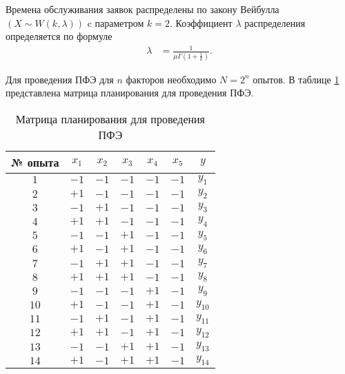 \documentclass[a4paper, 14pt]{extreport}
\begin{document}
\begin{MainPart}
Времена обслуживания заявок распределены по закону Вейбулла $(X \sim W(k, \lambda))$ c параметром $k = 2$.
Коэффициент $\lambda$ распределения определяется по формуле
\begin{equation}
	\begin{aligned}
		\lambda &= \frac{1}{\mu\Gamma{\left(1 + \frac1k\right)}}.
	\end{aligned}
\end{equation}

Для проведения ПФЭ для $n$ факторов необходимо $N = 2^n$ опытов.
В таблице \ref{tbl:full-planning-matrix} представлена матрица планирования для проведения ПФЭ.

\begin{table}[hbt!]
	\centering
	\captionsetup{justification=centering}
	\caption{Матрица планирования для проведения ПФЭ}
	\label{tbl:full-planning-matrix}
	\begin{tabular}{|c|c|c|c|c|c|c|}
		\hline
		№ опыта & $x_1$ & $x_2$ & $x_3$ & $x_4$ & $x_5$ & $y$      \\ \hline
		$1$     & $-1$  & $-1$  & $-1$  & $-1$  & $-1$  & $y_1$    \\ \hline
		$2$     & $+1$  & $-1$  & $-1$  & $-1$  & $-1$  & $y_2$    \\ \hline
		$3$     & $-1$  & $+1$  & $-1$  & $-1$  & $-1$  & $y_3$    \\ \hline
		$4$     & $+1$  & $+1$  & $-1$  & $-1$  & $-1$  & $y_4$    \\ \hline
		$5$     & $-1$  & $-1$  & $+1$  & $-1$  & $-1$  & $y_5$    \\ \hline
		$6$     & $+1$  & $-1$  & $+1$  & $-1$  & $-1$  & $y_6$    \\ \hline
		$7$     & $-1$  & $+1$  & $+1$  & $-1$  & $-1$  & $y_7$    \\ \hline
		$8$     & $+1$  & $+1$  & $+1$  & $-1$  & $-1$  & $y_8$    \\ \hline
		$9$     & $-1$  & $-1$  & $-1$  & $+1$  & $-1$  & $y_9$    \\ \hline
		$10$    & $+1$  & $-1$  & $-1$  & $+1$  & $-1$  & $y_{10}$ \\ \hline
		$11$    & $-1$  & $+1$  & $-1$  & $+1$  & $-1$  & $y_{11}$ \\ \hline
		$12$    & $+1$  & $+1$  & $-1$  & $+1$  & $-1$  & $y_{12}$ \\ \hline
		$13$    & $-1$  & $-1$  & $+1$  & $+1$  & $-1$  & $y_{13}$ \\ \hline
		$14$    & $+1$  & $-1$  & $+1$  & $+1$  & $-1$  & $y_{14}$ \\ \hline

\end{tabular}
\end{table}
\end{MainPart}
\end{document}
